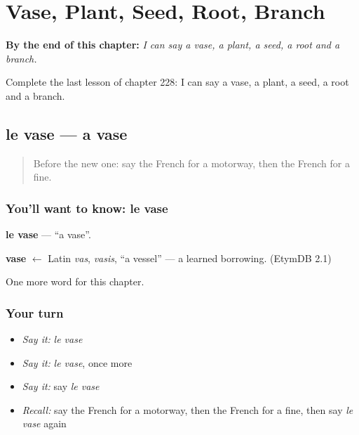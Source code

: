 
\chapter{Vase, Plant, Seed, Root, Branch}
\label{ch:fr-vase-plant-seed-root-branch}

\begin{chapteropening}
\textbf{By the end of this chapter:} \emph{I can say a vase, a plant, a seed, a root and a branch.}

Complete the last lesson of chapter 228: I can say a vase, a plant, a seed, a root and a branch.
\end{chapteropening}

\section[le vase]{le vase — a vase}

\label{lesson:FR-C228-vase}



\begin{quote}
Before the new one: say the French for a motorway, then the French for a fine.
\end{quote}

\subsection*{You'll want to know: le vase}
\textbf{le vase} — \textquotedblleft{}a vase\textquotedblright{}.

\begin{cousinweb}
\textbf{vase} $\leftarrow$ Latin \emph{vas}, \emph{vasis}, \textquotedblleft{}a vessel\textquotedblright{} — a learned borrowing. (EtymDB 2.1)
\end{cousinweb}

\begin{grammarlens}[title={What you've built}]
One more word for this chapter.
\end{grammarlens}

\subsection*{Your turn}
\begin{itemize}
\raggedright
  \item \emph{Say it:} \emph{le vase}
  \item \emph{Say it:} \emph{le vase}, once more
  \item \emph{Say it:} say \emph{le vase}
  \item \emph{Recall:} say the French for a motorway, then the French for a fine, then say \emph{le vase} again
\end{itemize}

